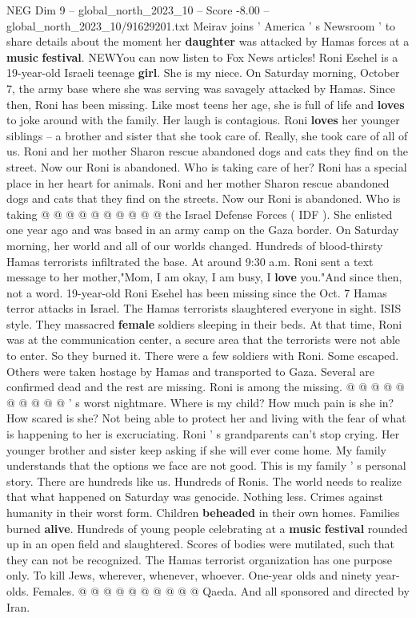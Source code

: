 \begin{textsample}{NEG Dim 9 – global\_north\_2023\_10 – Score -8.00 – global\_north\_2023\_10/91629201.txt}  \label{ex:f9_neg_038}
Meirav joins ' America ' s Newsroom ' to share details about the moment her \textbf{daughter} was attacked by Hamas forces at a \textbf{music} \textbf{festival}.
NEWYou can now listen to Fox News articles!
Roni Esehel is a 19-year-old Israeli teenage \textbf{girl}.
She is my niece.
On Saturday morning, October 7, the army base where she was serving was savagely attacked by Hamas.
Since then, Roni has been missing.
Like most teens her age, she is full of life and \textbf{loves} to joke around with the family.
Her laugh is contagious.
Roni \textbf{loves} her younger siblings -- a brother and sister that she took care of.
Really, she took care of all of us.
Roni and her mother Sharon rescue abandoned dogs and cats they find on the street.
Now our Roni is abandoned.
Who is taking care of her?
Roni has a special place in her heart for animals.
Roni and her mother Sharon rescue abandoned dogs and cats that they find on the streets.
Now our Roni is abandoned.
Who is taking @ @ @ @ @ @ @ @ @ @ the Israel Defense Forces ( IDF ).
She enlisted one year ago and was based in an army camp on the Gaza border.
On Saturday morning, her world and all of our worlds changed.
Hundreds of blood-thirsty Hamas terrorists infiltrated the base.
At around 9:30 a.m.
Roni sent a text message to her mother,"Mom, I am okay, I am busy, I \textbf{love} you."And since then, not a word. 19-year-old Roni Esehel has been missing since the Oct. 7 Hamas terror attacks in Israel.
The Hamas terrorists slaughtered everyone in sight.
ISIS style.
They massacred \textbf{female} soldiers sleeping in their beds.
At that time, Roni was at the communication center, a secure area that the terrorists were not able to enter.
So they burned it.
There were a few soldiers with Roni.
Some escaped.
Others were taken hostage by Hamas and transported to Gaza.
Several are confirmed dead and the rest are missing.
Roni is among the missing. @ @ @ @ @ @ @ @ @ @ ' s worst nightmare.
Where is my child?
How much pain is she in?
How scared is she?
Not being able to protect her and living with the fear of what is happening to her is excruciating.
Roni ' s grandparents can't stop crying.
Her younger brother and sister keep asking if she will ever come home.
My family understands that the options we face are not good.
This is my family ' s personal story.
There are hundreds like us.
Hundreds of Ronis.
The world needs to realize that what happened on Saturday was genocide.
Nothing less.
Crimes against humanity in their worst form.
Children \textbf{beheaded} in their own homes.
Families burned \textbf{alive}.
Hundreds of young people celebrating at a \textbf{music} \textbf{festival} rounded up in an open field and slaughtered.
Scores of bodies were mutilated, such that they can not be recognized.
The Hamas terrorist organization has one purpose only.
To kill Jews, wherever, whenever, whoever.
One-year olds and ninety year-olds.
Females. @ @ @ @ @ @ @ @ @ @ Qaeda.
And all sponsored and directed by Iran.

\end{textsample}
